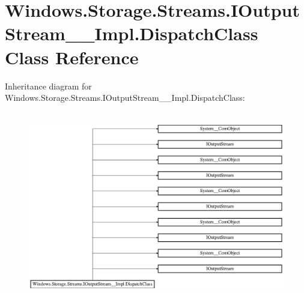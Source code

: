 \hypertarget{class_windows_1_1_storage_1_1_streams_1_1_i_output_stream_____impl_1_1_dispatch_class}{}\section{Windows.\+Storage.\+Streams.\+I\+Output\+Stream\+\_\+\+\_\+\+Impl.\+Dispatch\+Class Class Reference}
\label{class_windows_1_1_storage_1_1_streams_1_1_i_output_stream_____impl_1_1_dispatch_class}
Inheritance diagram for Windows.\+Storage.\+Streams.\+I\+Output\+Stream\+\_\+\+\_\+\+Impl.\+Dispatch\+Class\+:\begin{figure}[H]
\begin{center}
\leavevmode
\includegraphics[height=8.324325cm]{class_windows_1_1_storage_1_1_streams_1_1_i_output_stream_____impl_1_1_dispatch_class}
\end{center}
\end{figure}
